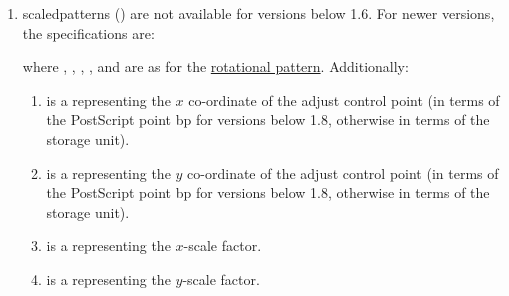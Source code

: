 \begin{numbered}
\begin{enumerate}
\begin{enumerate}
  \item {} is the angle of rotation and is stored as a
   (in radians) for versions below 1.8, otherwise is
  stored as an .

  \item {} is an  representing the number
    of replicas.

  \item {} is a  variable, true if single-path mode.

  \item {} is a  variable, true if the underlying
    path is visible.
  \end{enumerate}%

  \item\label{jdr:scaled}%
  \Glspl{scaledpattern} () are not available for versions below 1.6.
  For newer versions, the specifications are:
  \begin{syntaxline}
     
      
  \end{syntaxline}
  where , , ,
  ,  and  are as for the
  \hyperref[jdr:rotational]{rotational pattern}. Additionally:
    \begin{enumerate}
    \item {} is a  representing the
    $x$ \gls{co-ordinate} of the adjust control point (in terms of the
    PostScript point \gls{bp} for versions below 1.8, otherwise in terms
    of the storage unit).

    \item {} is a  representing the
    $y$ \gls{co-ordinate} of the adjust control point (in terms of the
    PostScript point \gls{bp} for versions below 1.8, otherwise in terms
    of the storage unit).

    \item {} is a  representing the
     $x$-scale factor.

    \item {} is a  representing the
     $y$-scale factor.
    \end{enumerate}%


\end{enumerate}
\end{numbered}
